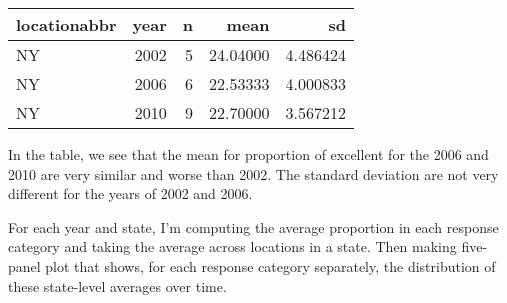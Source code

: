 \documentclass[]{article}
\newenvironment{Shaded}{\begin{snugshade}}{\end{snugshade}}
\newcommand{\KeywordTok}[1]{\textcolor[rgb]{0.13,0.29,0.53}{\textbf{#1}}}
\newcommand{\DataTypeTok}[1]{\textcolor[rgb]{0.13,0.29,0.53}{#1}}
\newcommand{\DecValTok}[1]{\textcolor[rgb]{0.00,0.00,0.81}{#1}}
\newcommand{\StringTok}[1]{\textcolor[rgb]{0.31,0.60,0.02}{#1}}
\newcommand{\OperatorTok}[1]{\textcolor[rgb]{0.81,0.36,0.00}{\textbf{#1}}}
\newcommand{\NormalTok}[1]{#1}
\begin{document}
\begin{Shaded}
\end{Shaded}

\begin{longtable}[]{@{}lrrrr@{}}
\toprule
locationabbr & year & n & mean & sd\tabularnewline
\midrule
\endhead
NY & 2002 & 5 & 24.04000 & 4.486424\tabularnewline
NY & 2006 & 6 & 22.53333 & 4.000833\tabularnewline
NY & 2010 & 9 & 22.70000 & 3.567212\tabularnewline
\bottomrule
\end{longtable}

In the table, we see that the mean for proportion of excellent for the
2006 and 2010 are very similar and worse than 2002. The standard
deviation are not very different for the years of 2002 and 2006.

For each year and state, I'm computing the average proportion in each
response category and taking the average across locations in a state.
Then making five-panel plot that shows, for each response category
separately, the distribution of these state-level averages over time.
\end{document}
